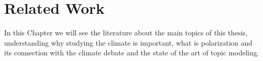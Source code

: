 
\chapter{Related Work}%
\label{Ch:related}

\ifpdf
    \graphicspath{{Chapter2/Figs/Raster/}{Chapter2/Figs/PDF/}{Chapter2/Figs/}}
\else
    \graphicspath{{Chapter2/Figs/Vector/}{Chapter2/Figs/}}
\fi

In this Chapter we will see the literature about the main topics of this thesis, understanding why studying the climate is important, what is polarization and its connection with the climate debate and the state of the art of topic modeling.








